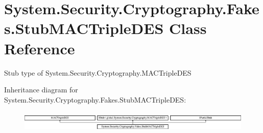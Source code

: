 \hypertarget{class_system_1_1_security_1_1_cryptography_1_1_fakes_1_1_stub_m_a_c_triple_d_e_s}{\section{System.\-Security.\-Cryptography.\-Fakes.\-Stub\-M\-A\-C\-Triple\-D\-E\-S Class Reference}
\label{class_system_1_1_security_1_1_cryptography_1_1_fakes_1_1_stub_m_a_c_triple_d_e_s}
}


Stub type of System.\-Security.\-Cryptography.\-M\-A\-C\-Triple\-D\-E\-S 


Inheritance diagram for System.\-Security.\-Cryptography.\-Fakes.\-Stub\-M\-A\-C\-Triple\-D\-E\-S\-:\begin{figure}[H]
\begin{center}
\leavevmode
\includegraphics[height=1.000894cm]{class_system_1_1_security_1_1_cryptography_1_1_fakes_1_1_stub_m_a_c_triple_d_e_s}
\end{center}
\end{figure}

